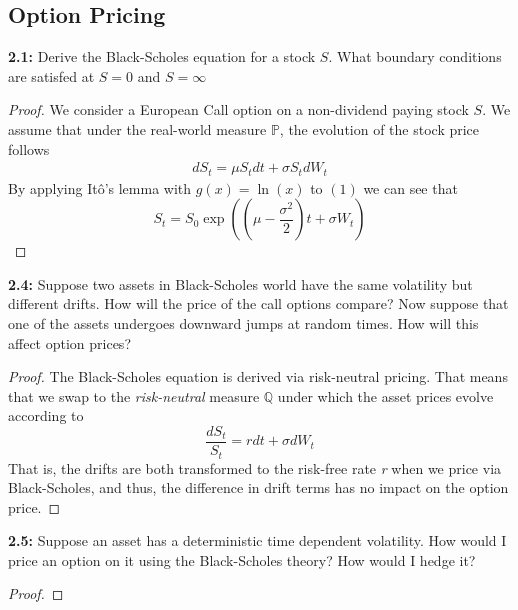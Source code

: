 \subsection{Option Pricing}

\begin{tcolorbox}[colframe=black,colback=gray!5,boxrule=0.5pt]
\textbf{2.1:} Derive the Black-Scholes equation for a stock $S$. What boundary conditions are satisfed at $S=0$ and $S=\infty$ 
\end{tcolorbox}
\begin{proof}
    We consider a European Call option on a non-dividend paying stock $S$. We assume that under the real-world measure $\mathbb{P}$, the evolution of the stock price follows
    \begin{align*}
        dS_t = \mu S_tdt + \sigma S_tdW_t \tag{1}
    \end{align*}
    By applying Itô's lemma with $g(x) = \ln(x)$ to $(1)$ we can see that 
    $$S_t = S_0\exp\left(\left(\mu-\frac{\sigma^2}{2}\right)t+\sigma W_t\right) $$
\end{proof}


\begin{tcolorbox}[colframe=black,colback=gray!5,boxrule=0.5pt]
\textbf{2.4:} Suppose two assets in Black-Scholes world have the same volatility but different drifts. How will the price of the call options compare? Now suppose that one of the assets undergoes downward jumps at random times. How will this affect option prices? 
\end{tcolorbox}
\begin{proof}
    The Black-Scholes equation is derived via risk-neutral pricing. That means that we swap to the \textit{risk-neutral} measure $\mathbb{Q}$ under which the asset prices evolve according to 
    $$\frac{dS_t}{S_t} = rdt + \sigma dW_t$$
    That is, the drifts are both transformed to the risk-free rate \textit{r} when we price via Black-Scholes, and thus, the difference in drift terms has no impact on the option price.
\end{proof}


\begin{tcolorbox}[colframe=black,colback=gray!5,boxrule=0.5pt]
\textbf{2.5:} Suppose an asset has a deterministic time dependent volatility.
How would I price an option on it using the Black-Scholes theory? How would
I hedge it?
\end{tcolorbox}
\begin{proof}
    
\end{proof}

